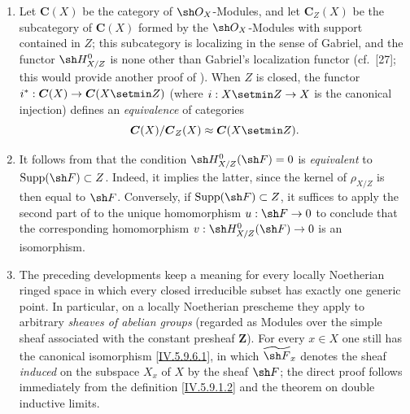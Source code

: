 
\begin{remarks}[5.9.12]
\label{IV.5.9.12}
\begin{enumerate}[{\rm(i)}]
  \item\label{IV.5.9.12.i}
    Let $\boldsymbol{C}(X)$ be the category of $\sh O_X$-Modules, and let
    $\boldsymbol{C}_Z(X)$ be the subcategory of $\boldsymbol{C}(X)$ formed by
    the $\sh O_X$-Modules with support contained in $Z$; this subcategory
    is localizing in the sense of Gabriel, and the functor
    $\sh H^0_{X/Z}$ is none other than Gabriel's localization functor
    (cf.~\textup{[27]}; this would provide another proof of
    ).  When $Z$ is closed, the functor
    $i^*:\boldsymbol{C}(X)\to\boldsymbol{C}(X\setmin Z)$ (where
    $i:X\setmin Z\to X$ is the canonical injection) defines an
    \emph{equivalence} of categories
    \[
      \boldsymbol{C}(X)/\boldsymbol{C}_Z(X)\approx\boldsymbol{C}(X\setmin Z).
    \]
  \item\label{IV.5.9.12.ii}
    It follows from  that the condition
    $\sh H^0_{X/Z}(\sh F)=0$ is \emph{equivalent} to
    $\operatorname{Supp}(\sh F)\subset Z$.  Indeed, it implies the latter,
    since the kernel of $\rho_{X/Z}$ is then equal to $\sh F$.
    Conversely, if $\operatorname{Supp}(\sh F)\subset Z$, it suffices to
    apply the second part of  to the unique homomorphism
    $u:\sh F\to0$ to conclude that the corresponding homomorphism
    $v:\sh H^0_{X/Z}(\sh F)\to0$ is an isomorphism.
  \item\label{IV.5.9.12.iii}
    The preceding developments keep a meaning for every locally
    Noetherian ringed space in which every closed irreducible subset
    has exactly one generic point.  In particular, on a locally
    Noetherian prescheme they apply to arbitrary \emph{sheaves of abelian
    groups} (regarded as Modules over the simple sheaf associated with
    the constant presheaf $\mathbf Z$).  For every $x\in X$ one still has
    the canonical isomorphism \eqref{IV.5.9.6.1}, in which
    $\widetilde{\sh F}_x$ denotes the sheaf \emph{induced} on the
    subspace $X_x$ of $X$ by the sheaf $\sh F$; the direct proof follows
    immediately from the definition \eqref{IV.5.9.1.2} and the theorem
    on double inductive limits.
\end{enumerate}
\end{remarks}
